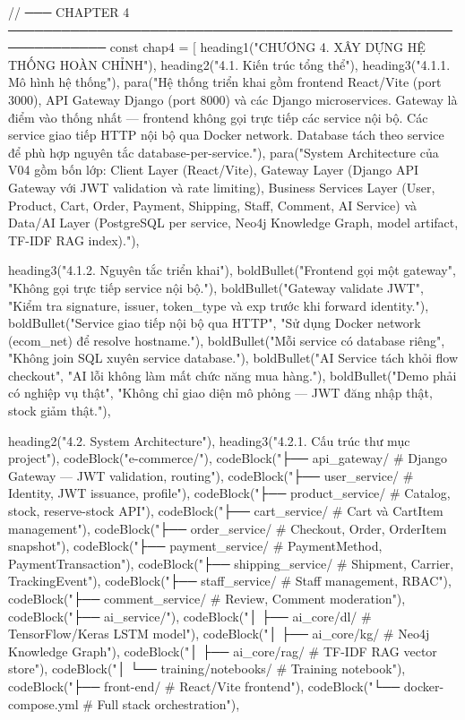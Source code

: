 {{{// ─── CHAPTER 4 ─────────────────────────────────────────────────────────────
const chap4 = [
  heading1("CHƯƠNG 4. XÂY DỰNG HỆ THỐNG HOÀN CHỈNH"),
  heading2("4.1. Kiến trúc tổng thể"),
  heading3("4.1.1. Mô hình hệ thống"),
  para("Hệ thống triển khai gồm frontend React/Vite (port 3000), API Gateway Django (port 8000) và các Django microservices. Gateway là điểm vào thống nhất — frontend không gọi trực tiếp các service nội bộ. Các service giao tiếp HTTP nội bộ qua Docker network. Database tách theo service để phù hợp nguyên tắc database-per-service."),
  para("System Architecture của V04 gồm bốn lớp: Client Layer (React/Vite), Gateway Layer (Django API Gateway với JWT validation và rate limiting), Business Services Layer (User, Product, Cart, Order, Payment, Shipping, Staff, Comment, AI Service) và Data/AI Layer (PostgreSQL per service, Neo4j Knowledge Graph, model artifact, TF-IDF RAG index)."),

  heading3("4.1.2. Nguyên tắc triển khai"),
  boldBullet("Frontend gọi một gateway", "Không gọi trực tiếp service nội bộ."),
  boldBullet("Gateway validate JWT", "Kiểm tra signature, issuer, token_type và exp trước khi forward identity."),
  boldBullet("Service giao tiếp nội bộ qua HTTP", "Sử dụng Docker network (ecom_net) để resolve hostname."),
  boldBullet("Mỗi service có database riêng", "Không join SQL xuyên service database."),
  boldBullet("AI Service tách khỏi flow checkout", "AI lỗi không làm mất chức năng mua hàng."),
  boldBullet("Demo phải có nghiệp vụ thật", "Không chỉ giao diện mô phỏng — JWT đăng nhập thật, stock giảm thật."),

  heading2("4.2. System Architecture"),
  heading3("4.2.1. Cấu trúc thư mục project"),
  codeBlock("e-commerce/"),
  codeBlock("├── api_gateway/        # Django Gateway — JWT validation, routing"),
  codeBlock("├── user_service/       # Identity, JWT issuance, profile"),
  codeBlock("├── product_service/    # Catalog, stock, reserve-stock API"),
  codeBlock("├── cart_service/       # Cart và CartItem management"),
  codeBlock("├── order_service/      # Checkout, Order, OrderItem snapshot"),
  codeBlock("├── payment_service/    # PaymentMethod, PaymentTransaction"),
  codeBlock("├── shipping_service/   # Shipment, Carrier, TrackingEvent"),
  codeBlock("├── staff_service/      # Staff management, RBAC"),
  codeBlock("├── comment_service/    # Review, Comment moderation"),
  codeBlock("├── ai_service/"),
  codeBlock("│   ├── ai_core/dl/     # TensorFlow/Keras LSTM model"),
  codeBlock("│   ├── ai_core/kg/     # Neo4j Knowledge Graph"),
  codeBlock("│   ├── ai_core/rag/    # TF-IDF RAG vector store"),
  codeBlock("│   └── training/notebooks/  # Training notebook"),
  codeBlock("├── front-end/          # React/Vite frontend"),
  codeBlock("└── docker-compose.yml  # Full stack orchestration"),

}}}
